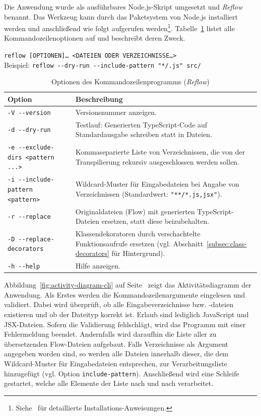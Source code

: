 Die Anwendung wurde als ausführbares Node.js-Skript umgesetzt und \textit{Reflow} benannt. Das Werkzeug kann durch das Paketsystem von Node.js installiert werden und anschließend wie folgt aufgerufen werden\footnote{Siehe~\autocite{REFLOW_GITHUB} für detaillierte Installations-Anweisungen.}. Tabelle~\ref{tab:cli-options} listet alle Kommandozeilenoptionen auf und beschreibt deren Zweck.

{
  \texttt{reflow [OPTIONEN]… <DATEIEN ODER VERZEICHNISSE…>}\\
  Beispiel: \texttt{reflow -{}-dry-run -{}-include-pattern "{}*/.js"{} src/}
}

\bigskip
\begin{table}[tbh]
  \small
  \begin{tabularx}{\textwidth}{@{}lX@{}}
    \midrule
    \textbf{Option} & \textbf{Beschreibung} \\
    \midrule
    \smallskip
    \texttt{-V -{}-version} & Versionsnummer anzeigen. \\
    \smallskip
    \texttt{-d -{}-dry-run} & Testlauf: Generierten TypeScript-Code auf Standardausgabe schreiben statt in Dateien.\\
    \smallskip
    \texttt{-e -{}-exclude-dirs <pattern ...>} & Kommaseparierte Liste von Verzeichnissen, die von der Transpilierung rekursiv ausgeschlossen werden sollen. \\
    \smallskip
    \texttt{-i -{}-include-pattern <pattern>} & Wildcard-Muster für Eingabedateien bei Angabe von Verzeichnissen (Standardwert: \texttt{"**/*.{js,jsx}"}). \\
    \smallskip
    \texttt{-r -{}-replace} & Originaldateien (Flow) mit generierten TypeScript-Dateien ersetzen, statt diese beizubehalten. \\
    \smallskip
    \texttt{-D -{}-replace-decorators} & Klassendekoratoren durch verschachtelte Funktionsaufrufe ersetzen (vgl. Abschnitt~\ref{subsec:class-decorators} für Hintergrund). \\
    \smallskip
    \texttt{-h -{}-help} & Hilfe anzeigen. \\
    \midrule
  \end{tabularx}
  \caption{Optionen des Kommandozeilenprogramms (\textit{Reflow})}
  \label{tab:cli-options}
\end{table}

Abbildung~\ref{fig:activity-diagram-cli} auf Seite~\pageref{fig:activity-diagram-cli} zeigt das Aktivitätsdiagramm der Anwendung. Als Erstes werden die Kommandozeilenargumente eingelesen und validiert. Dabei wird überprüft, ob alle Eingabeverzeichnisse bzw. -dateien existieren und ob der Dateityp korrekt ist. Erlaub sind lediglich JavaScript und JSX-Dateien. Sofern die Validierung fehlschlägt, wird das Programm mit einer Fehlermeldung beendet.
Andernfalls wird daraufhin die Liste aller zu übersetzenden Flow-Dateien aufgebaut. Falls Verzeichnisse als Argument angegeben worden sind, so werden alle Dateien innerhalb dieser, die dem Wildcard-Muster für Eingabedateien entsprechen, zur Verarbeitungsliste hinzugefügt (vgl. Option \texttt{include-pattern}).
Anschließend wird eine Schleife gestartet, welche alle Elemente der Liste nach und nach verarbeitet.


